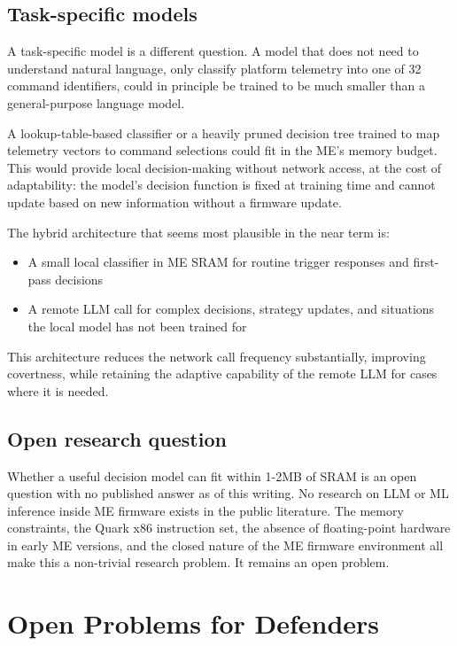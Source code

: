 \documentclass[11pt,a4paper]{article}
\begin{document}
\subsection{Task-specific models}

A task-specific model is a different question. A model that does not need to understand natural language, only classify platform telemetry into one of 32 command identifiers, could in principle be trained to be much smaller than a general-purpose language model.

A lookup-table-based classifier or a heavily pruned decision tree trained to map telemetry vectors to command selections could fit in the ME's memory budget. This would provide local decision-making without network access, at the cost of adaptability: the model's decision function is fixed at training time and cannot update based on new information without a firmware update.

The hybrid architecture that seems most plausible in the near term is:

\begin{itemize}[noitemsep]
\item A small local classifier in ME SRAM for routine trigger responses and first-pass decisions
\item A remote LLM call for complex decisions, strategy updates, and situations the local model has not been trained for
\end{itemize}

This architecture reduces the network call frequency substantially, improving covertness, while retaining the adaptive capability of the remote LLM for cases where it is needed.

\subsection{Open research question}

Whether a useful decision model can fit within 1-2MB of SRAM is an open question with no published answer as of this writing. No research on LLM or ML inference inside ME firmware exists in the public literature. The memory constraints, the Quark x86 instruction set, the absence of floating-point hardware in early ME versions, and the closed nature of the ME firmware environment all make this a non-trivial research problem. It remains an open problem.

\section{Open Problems for Defenders}
\end{document}
